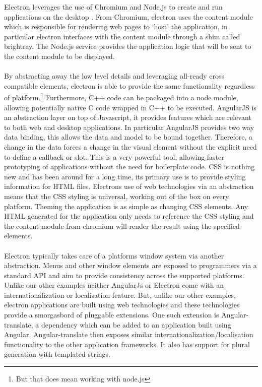 %
  Electron leverages the use of Chromium and Node.js to create and run applications on the desktop \cite{electron_about}. From Chromium, electron uses the content module which is responsible for rendering web pages to `host' the application, in particular electron interfaces with the content module through a shim called brightray\cite{electron_content_module}. The Node.js service provides the application logic that will be sent to the content module to be displayed.\\\\
  By abstracting away the low level details and leveraging all-ready cross compatible elements, electron is able to provide the same functionality regardless of platform.\footnote{But that does mean working with node.js} Furthermore, C++ code can be packaged into a node module, allowing potentially native C code wrapped in C++ to be executed.
  AngularJS is an abstraction layer on top of Javascript, it provides features which are relevant to both web and desktop applications\cite{angular}. In particular AngularJS provides two way data binding, this allows the data and model to be bound together\cite{angular_data_binding}. Therefore, a change in the data forces a change in the visual element without the explicit need to define a callback or slot. This is a very powerful tool, allowing faster prototyping of applications without the need for boilerplate code.
  CSS is nothing new and has been around for a long time, its primary use is to provide styling information for HTML files. Electrons use of web technologies via an abstraction means that the CSS styling is universal, working out of the box on every platform. Theming the application is as simple as changing CSS elements. Any HTML generated for the application only needs to reference the CSS styling and the content module from chromium will render the result using the specified elements.\\\\
  Electron typically takes care of a platforms window system via another abstraction. Menus\cite{electron_menu} and other window elements are exposed to programmers via a standard API and aim to provide consistency across the supported platforms.
  Unlike our other examples neither AngularJs or Electron come with an internationalization or localisation feature. But, unlike our other examples, electron applications are built using web technologies and these technologies provide a smorgasbord of pluggable extensions. One such extension is Angular-translate, a dependency which can be added to an application built using Angular\cite{angular_translate}. Angular-translate then exposes similar internationalization/localisation functionality to the other application frameworks. It also has support for plural generation with templated strings.

